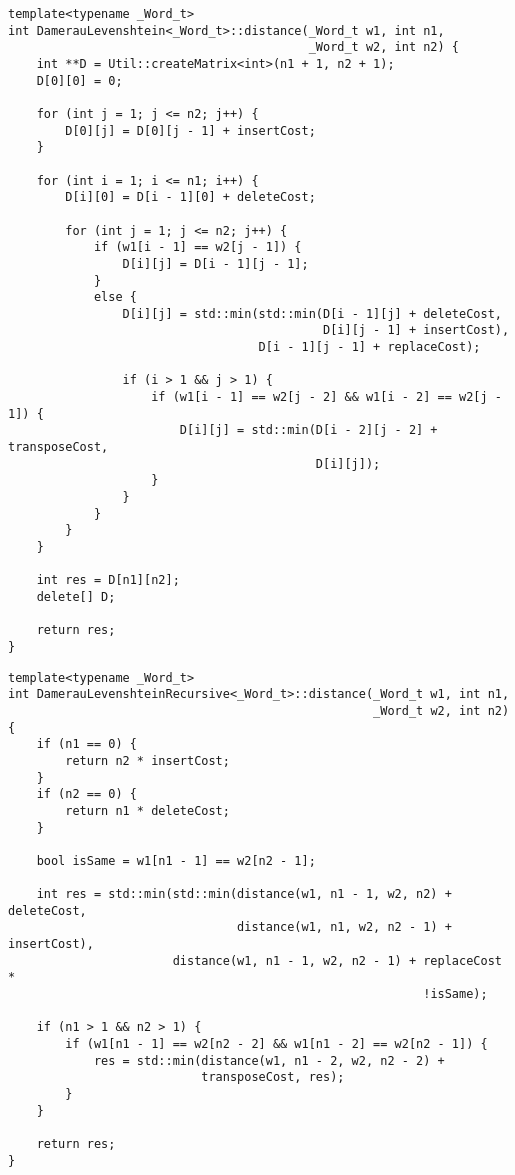 \noindent\begin{minipage}{\textwidth}
\begin{lstlisting}[caption=Расстояние Дамерау-Левенштейна (матричная реализация)]
template<typename _Word_t>
int DamerauLevenshtein<_Word_t>::distance(_Word_t w1, int n1,
                                          _Word_t w2, int n2) {
    int **D = Util::createMatrix<int>(n1 + 1, n2 + 1);
    D[0][0] = 0;

    for (int j = 1; j <= n2; j++) {
        D[0][j] = D[0][j - 1] + insertCost;
    }

    for (int i = 1; i <= n1; i++) {
        D[i][0] = D[i - 1][0] + deleteCost;

        for (int j = 1; j <= n2; j++) {
            if (w1[i - 1] == w2[j - 1]) {
                D[i][j] = D[i - 1][j - 1];
            }
            else {
                D[i][j] = std::min(std::min(D[i - 1][j] + deleteCost,
                                            D[i][j - 1] + insertCost),
                                   D[i - 1][j - 1] + replaceCost);

                if (i > 1 && j > 1) {
                    if (w1[i - 1] == w2[j - 2] && w1[i - 2] == w2[j - 1]) {
                        D[i][j] = std::min(D[i - 2][j - 2] + transposeCost,
                                           D[i][j]);
                    }
                }
            }
        }
    }

    int res = D[n1][n2];
    delete[] D;

    return res;
}
\end{lstlisting}
\end{minipage}

\noindent\begin{minipage}{\textwidth}
\begin{lstlisting}[caption=Расстояние Дамерау-Левенштейна (рекурсивная реализация)]
template<typename _Word_t>
int DamerauLevenshteinRecursive<_Word_t>::distance(_Word_t w1, int n1,
                                                   _Word_t w2, int n2) {
    if (n1 == 0) {
        return n2 * insertCost;
    }
    if (n2 == 0) {
        return n1 * deleteCost;
    }

    bool isSame = w1[n1 - 1] == w2[n2 - 1];

    int res = std::min(std::min(distance(w1, n1 - 1, w2, n2) + deleteCost,
                                distance(w1, n1, w2, n2 - 1) + insertCost),
                       distance(w1, n1 - 1, w2, n2 - 1) + replaceCost *
                                                          !isSame);

    if (n1 > 1 && n2 > 1) {
        if (w1[n1 - 1] == w2[n2 - 2] && w1[n1 - 2] == w2[n2 - 1]) {
            res = std::min(distance(w1, n1 - 2, w2, n2 - 2) +
                           transposeCost, res);
        }
    }

    return res;
}
\end{lstlisting}
\end{minipage}

